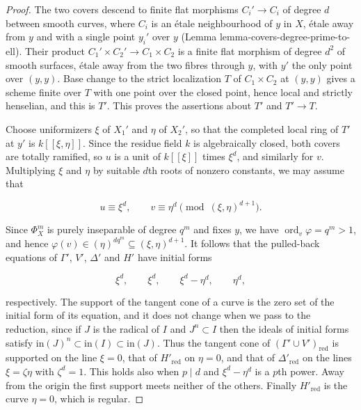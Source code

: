 \documentclass[11pt]{article}
\begin{document}
\begin{proof}[{Proof}]\label{bp41}%
The two covers descend to finite flat morphisms \(C_i'\to C_i\) of degree \(d\) between smooth curves, where \(C_i\) is an étale neighbourhood of \(y\) in \(X\), étale away from \(y\) and with a single point \(y_i'\) over \(y\) (Lemma lemma-covers-degree-prime-to-ell). Their product \(C_1'\times C_2'\to C_1\times C_2\) is a finite flat morphism of degree \(d^2\) of smooth surfaces, étale away from the two fibres through \(y\), with \(y'\) the only point over \((y,y)\). Base change to the strict localization \(T\) of \(C_1\times C_2\) at \((y,y)\) gives a scheme finite over \(T\) with one point over the closed point, hence local and strictly henselian, and this is \(T'\). This proves the assertions about \(T'\) and \(T'\to T\).

Choose uniformizers \(\xi\) of \(X_1'\) and \(\eta\) of \(X_2'\), so that the completed local ring of \(T'\) at \(y'\) is \(k[[\xi,\eta]]\). Since the residue field \(k\) is algebraically closed, both covers are totally ramified, so \(u\) is a unit of \(k[[\xi]]\) times \(\xi^d\), and similarly for \(v\). Multiplying \(\xi\) and \(\eta\) by suitable \(d\)th roots of nonzero constants, we may assume that

\[
u\equiv\xi^d,\qquad v\equiv\eta^d\pmod{(\xi,\eta)^{d+1}}.
\]

Since \(\Phi_X^m\) is purely inseparable of degree \(q^m\) and fixes \(y\), we have \(\operatorname{ord}_v\varphi=q^m>1\), and hence \(\varphi(v)\in(\eta)^{dq^m}\subseteq(\xi,\eta)^{d+1}\). It follows that the pulled-back equations of \(\Gamma'\), \(V'\), \(\Delta'\) and \(H'\) have initial forms

\[
\xi^d,\qquad\xi^d,\qquad\xi^d-\eta^d,\qquad\eta^d,
\]

respectively. The support of the tangent cone of a curve is the zero set of the initial form of its equation, and it does not change when we pass to the reduction, since if \(J\) is the radical of \(I\) and \(J^n\subset I\) then the ideals of initial forms satisfy \(\mathrm{in}(J)^n\subset\mathrm{in}(I)
\subset\mathrm{in}(J)\). Thus the tangent cone of \((\Gamma'\cup V')_{\mathrm{red}}\) is supported on the line \(\xi=0\), that of \(H'_{\mathrm{red}}\) on \(\eta=0\), and that of \(\Delta'_{\mathrm{red}}\) on the lines \(\xi=\zeta\eta\) with \(\zeta^d=1\). This holds also when \(p\mid d\) and \(\xi^d-\eta^d\) is a \(p\)th power. Away from the origin the first support meets neither of the others. Finally \(H'_{\mathrm{red}}\) is the curve \(\eta=0\), which is regular.
\end{proof}
\end{document}
